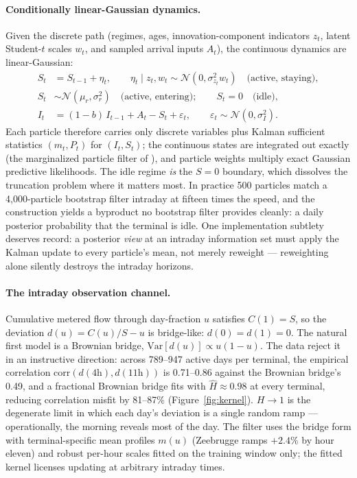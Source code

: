 \documentclass[11pt]{article}
\begin{document}
\paragraph{Conditionally linear-Gaussian dynamics.} Given the discrete
path (regimes, ages, innovation-component indicators $z_t$, latent
Student-$t$ scales $w_t$, and sampled arrival inputs $A_t$), the
continuous dynamics are linear-Gaussian:
\begin{align*}
S_t &= S_{t-1} + \eta_t, \qquad \eta_t \mid z_t, w_t \sim
\mathcal N(0, \sigma_{z_t}^2 w_t) \quad\text{(active, staying)},\\
S_t &\sim \mathcal N(\mu_r, \sigma_r^2) \quad\text{(active, entering)};
\qquad S_t = 0 \quad\text{(idle)},\\
I_t &= (1-b)\, I_{t-1} + A_t - S_t + \varepsilon_t,\qquad
\varepsilon_t \sim \mathcal N(0,\sigma_I^2).
\end{align*}
Each particle therefore carries only discrete variables plus Kalman
sufficient statistics $(m_t, P_t)$ for $(I_t, S_t)$; the continuous states
are integrated out exactly (the marginalized particle filter of
\cite{sgn2005}), and particle weights multiply exact Gaussian predictive
likelihoods. The idle regime \emph{is} the $S=0$ boundary, which
dissolves the truncation problem where it matters most. In practice 500
particles match a 4{,}000-particle bootstrap filter intraday at
fifteen times the speed, and the construction yields a byproduct no
bootstrap filter provides cleanly: a daily posterior probability that the
terminal is idle. One implementation subtlety deserves record: a posterior
\emph{view} at an intraday information set must apply the Kalman update to
every particle's mean, not merely reweight --- reweighting alone silently
destroys the intraday horizons.

\paragraph{The intraday observation channel.} Cumulative metered flow
through day-fraction $u$ satisfies $C(1)=S$, so the deviation
$d(u) = C(u)/S - u$ is bridge-like: $d(0)=d(1)=0$. The natural first model
is a Brownian bridge, $\mathrm{Var}[d(u)] \propto u(1-u)$. The data
reject it in an instructive direction: across 789--947 active days per
terminal, the empirical correlation $\mathrm{corr}(d(4\mathrm h), d(11\mathrm h))$
is 0.71--0.86 against the Brownian bridge's 0.49, and a fractional
Brownian bridge fits with $\hat H \approx 0.98$ at every terminal,
reducing correlation misfit by 81--87\% (Figure~\ref{fig:kernel}).
$H \to 1$ is the degenerate limit in which each day's deviation is a
single random ramp --- operationally, the morning reveals most of the
day. The filter uses the bridge form with terminal-specific mean profiles
$m(u)$ (Zeebrugge ramps $+2.4$\% by hour eleven) and robust per-hour
scales fitted on the training window only; the fitted kernel licenses
updating at arbitrary intraday times.
\end{document}
